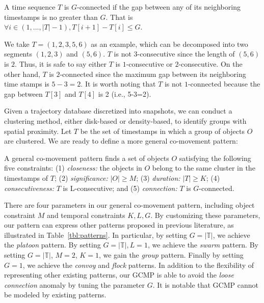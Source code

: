 \begin{definition}[$G$-connected]
A time sequence $T$ is $G$-connected if the gap between any of its neighboring timestamps is no greater than $G$. That is
 $\forall i \in (1,...,|T|-1), T[i+1]-T[i] \leq G$.
\end{definition}

We take $T=(1,2,3,5,6)$ as an example, which can be decomposed into two segments $(1,2,3)$ and $(5,6)$. $T$ is not $3$-consecutive since the length of $(5,6)$ is $2$. Thus, it is safe to say either $T$ is $1$-consecutive or $2$-consecutive. On the other hand, $T$ is $2$-connected since the maximum gap between its neighboring time stamps is $5-3=2$. It is worth noting that $T$ is not $1$-connected because the gap between $T[3]$ and $T[4]$ is 2 (i.e., 5-3=2).

Given a trajectory database discretized into snapshots, we can conduct a clustering method, either disk-based or density-based, to identify groups with spatial proximity. Let $T$ be the set of timestamps in which a group of objects $O$ are clustered. We are ready to define a more general co-movement pattern:
\begin{definition}
A general co-movement pattern finds a set of objects $O$ satisfying the following five constraints: (1) \textit{closeness:} the objects in $O$ belong to the same cluster in the timestamps of $T$; (2) \textit{significance:} $|O| \geq M$; (3) \textit{duration:} $|T| \geq K$; (4) \textit{consecutiveness:} $T$ is L-consecutive; and (5) \textit{connection:} $T$ is $G$-connected.
\end{definition}
There are four parameters in our general co-movement pattern, including object constraint $M$ and temporal constraints $K,L,G$.  By customizing these parameters, our pattern can 
express other patterns proposed in previous literature, as illustrated in Table~\ref{tbl:patterns}. 
In particular, by setting $G=|\mathbb{T}|$, we achieve the \emph{platoon} pattern. By setting $G=|\mathbb{T}|,L=1$, we achieve the \emph{swarm} pattern. By setting $G=|\mathbb{T}|$, $M=2$, $K=1$, we gain the \emph{group} pattern. Finally by setting $G=1$, we achieve the \emph{convoy} and \emph{flock} patterns. 
In addition to the flexibility of representing other existing patterns, our GCMP is able to avoid the \emph{loose connection} anomaly by tuning the parameter $G$. 
It is notable that GCMP cannot be modeled by existing patterns. 
